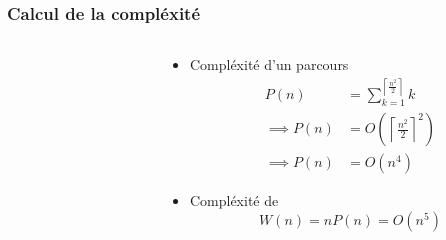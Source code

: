 \begin{frame}
  \frametitle{Calcul de la compléxité}
  \begin{columns}
    \begin{column}{5cm}
      \hexWorstCase
    \end{column}
    \begin{column}{5cm}
    \begin{itemize}
      \item Compléxité d'un parcours
      \begin{align*}
        P(n) &= \sum^{\left\lceil\frac{n^2}{2}\right\rceil}_{k = 1} k \\
        \implies P(n) &= O\left(\left\lceil\frac{n^2}{2}\right\rceil^2\right) \\
        \implies P(n) &= O\left(n^4\right)
      \end{align*}
      \item Compléxité de 
      \[
        W(n) = n P(n) = O\left(n^5\right)
      \]
    \end{itemize}
    \end{column}
  \end{columns}
\end{frame}
